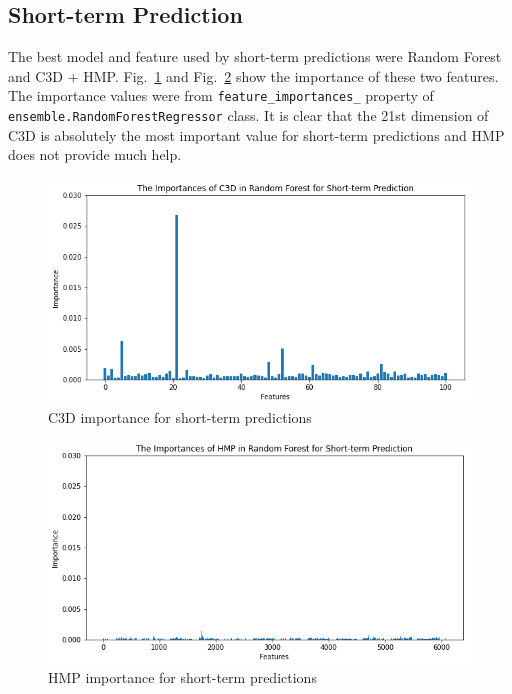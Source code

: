 \documentclass[conference, compsoc]{IEEEtran}
\begin{document}
{\subsection{Short-term Prediction}
The best model and feature used by short-term predictions were Random Forest and C3D + HMP.
Fig.~\ref{fig:c3d-short-importance} and Fig.~\ref{fig:hmp-short-importance} show the importance of these two features.
The importance values were from \verb|feature_importances_| property of \verb|ensemble.RandomForestRegressor| class.
It is clear that the 21st dimension of C3D is absolutely the most important value for short-term predictions and HMP does not provide much help.

\begin{figure}[htbp]
    \centerline{\includegraphics[width=\linewidth]{figures/c3d-short-importance.png}}
    \caption{C3D importance for short-term predictions}
    \label{fig:c3d-short-importance}
\end{figure}

\begin{figure}[htbp]
    \centerline{\includegraphics[width=\linewidth]{figures/hmp-short-importance.png}}
    \caption{HMP importance for short-term predictions}
    \label{fig:hmp-short-importance}
\end{figure}

}
\end{document}
